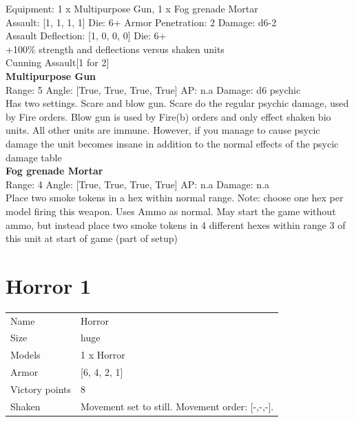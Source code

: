 Equipment: 1 x Multipurpose Gun, 1 x Fog grenade Mortar \\

Assault: [1, 1, 1, 1] Die: 6+ Armor Penetration: 2 Damage: d6-2 \\
Assault Deflection: [1, 0, 0, 0] Die: 6+\\
\indent +100\% strength and deflections versus shaken units\\ 
Cunning Assault[1 for 2]\\ 
 



{\bf Multipurpose Gun } \\



Range: 5  Angle: [True, True, True, True] AP: n.a Damage: d6 psychic \\
Has two settings. Scare and blow gun. Scare do the regular psychic damage, used by Fire orders. Blow gun is used by Fire(b) orders and only effect shaken bio units. All other units are immune. However, if you manage to cause psycic damage the unit becomes insane in addition to the normal effects of the psycic damage table\\ 




{\bf Fog grenade Mortar } \\



Range: 4  Angle: [True, True, True, True] AP: n.a Damage: n.a \\
Place two smoke tokens in a hex within normal range. Note: choose one hex per model firing this weapon. Uses Ammo as normal. May start the game without ammo, but instead place two smoke tokens in 4 different hexes within range 3 of this unit at start of game (part of setup)\\ 




 















\clearpage

\section{ Horror 1 }

\begin{tabular}{ll}
  Name & Horror \\
  Size & huge\\
  Models & 1 x Horror\\
  Armor & [6, 4, 2, 1]\\
  Victory points & 8\\
  Shaken & Movement set to still. Movement order: [-,-,-]. \\
\end{tabular}

